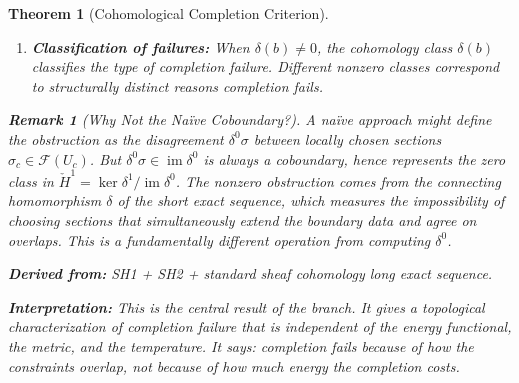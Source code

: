 \documentclass[11pt,letterpaper]{article}
\newtheorem{theorem}[conjecture]{Theorem}
\newtheorem{remark}[conjecture]{Remark}
\newcommand{\Hcech}{\check{H}}
\newcommand{\sheaf}{\mathcal{F}}
\DeclareMathOperator{\im}{im}
\begin{document}
\begin{theorem}[Cohomological Completion 
Criterion]
\begin{enumerate}[label=(\alph*)]
    \item \textbf{Classification of failures:} When $\delta(b) \neq 0$, 
    the cohomology class $\delta(b)$ classifies the \emph{type} of 
    completion failure. Different nonzero classes correspond to 
    structurally distinct reasons completion fails.
\end{enumerate}

\begin{remark}[Why Not the Na\"ive Coboundary?]\label{rem:not_coboundary}
A na\"ive approach might define the obstruction as the disagreement 
$\delta^0 \sigma$ between locally chosen sections $\sigma_c \in 
\sheaf(U_c)$. But $\delta^0 \sigma \in \im \delta^0$ is 
\emph{always a coboundary}, hence represents the zero class in 
$\Hcech^1 = \ker \delta^1 / \im \delta^0$. The nonzero obstruction 
comes from the \emph{connecting homomorphism} $\delta$ of the short 
exact sequence, which measures the \emph{impossibility of choosing 
sections that simultaneously extend the boundary data and agree on 
overlaps}. This is a fundamentally different operation from computing 
$\delta^0$.
\end{remark}

\textbf{Derived from:} SH1 + SH2 + standard sheaf cohomology long 
exact sequence.

\textbf{Interpretation:} This is the central result of the branch. It 
gives a \emph{topological} characterization of completion failure that 
is independent of the energy functional, the metric, and the temperature. 
It says: completion fails because of \emph{how the constraints 
overlap}, not because of how much energy the completion costs.
\end{theorem}
\end{document}
